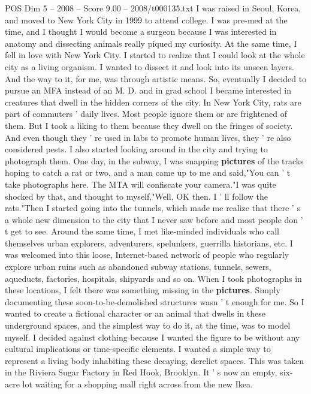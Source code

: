 \begin{textsample}{POS Dim 5 – 2008 – Score 9.00 – 2008/t000135.txt}  \label{ex:f5_pos_014}
I was raised in Seoul, Korea, and moved to New York City in 1999 to attend college.
I was pre-med at the time, and I thought I would become a surgeon because I was interested in anatomy and dissecting animals really piqued my curiosity.
At the same time, I fell in love with New York City.
I started to realize that I could look at the whole city as a living organism.
I wanted to dissect it and look into its unseen layers.
And the way to it, for me, was through artistic means.
So, eventually I decided to pursue an MFA instead of an M.
D. and in grad school I became interested in creatures that dwell in the hidden corners of the city.
In New York City, rats are part of commuters ' daily lives.
Most people ignore them or are frightened of them.
But I took a liking to them because they dwell on the fringes of society.
And even though they ' re used in labs to promote human lives, they ' re also considered pests.
I also started looking around in the city and trying to photograph them.
One day, in the subway, I was snapping \textbf{pictures} of the tracks hoping to catch a rat or two, and a man came up to me and said,"You can ' t take photographs here.
The MTA will confiscate your camera."I was quite shocked by that, and thought to myself,"Well, OK then.
I ' ll follow the rats."Then I started going into the tunnels, which made me realize that there ' s a whole new dimension to the city that I never saw before and most people don ' t get to see.
Around the same time, I met like-minded individuals who call themselves urban explorers, adventurers, spelunkers, guerrilla historians, etc.
I was welcomed into this loose, Internet-based network of people who regularly explore urban ruins such as abandoned subway stations, tunnels, sewers, aqueducts, factories, hospitals, shipyards and so on.
When I took photographs in these locations, I felt there was something missing in the \textbf{pictures}.
Simply documenting these soon-to-be-demolished structures wasn ' t enough for me.
So I wanted to create a fictional character or an animal that dwells in these underground spaces, and the simplest way to do it, at the time, was to model myself.
I decided against clothing because I wanted the figure to be without any cultural implications or time-specific elements.
I wanted a simple way to represent a living body inhabiting these decaying, derelict spaces.
This was taken in the Riviera Sugar Factory in Red Hook, Brooklyn.
It ' s now an empty, six-acre lot waiting for a shopping mall right across from the new Ikea.

\end{textsample}
